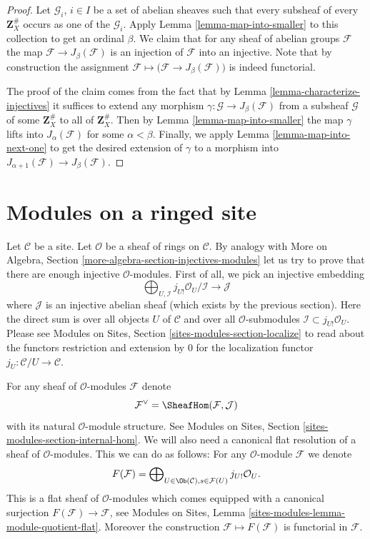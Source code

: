 \begin{proof}
Let $\mathcal{G}_i$, $i \in I$ be a set of abelian
sheaves such that every subsheaf of every $\mathbf{Z}_X^\#$
occurs as one of the $\mathcal{G}_i$. Apply
Lemma \ref{lemma-map-into-smaller} to this collection to
get an ordinal $\beta$. We claim that for any sheaf of abelian
groups $\mathcal{F}$ the map $\mathcal{F} \to J_\beta(\mathcal{F})$
is an injection of $\mathcal{F}$ into an injective.
Note that by construction the assignment
$\mathcal{F} \mapsto \big(\mathcal{F} \to J_\beta(\mathcal{F})\big)$
is indeed functorial.

\medskip\noindent
The proof of the claim comes from the fact that by
Lemma \ref{lemma-characterize-injectives} it suffices to extend any
morphism $\gamma : \mathcal{G} \to J_\beta(\mathcal{F})$
from a subsheaf $\mathcal{G}$ of some $\mathbf{Z}_X^\#$ to all of
$\mathbf{Z}_X^\#$. Then by Lemma \ref{lemma-map-into-smaller} the
map $\gamma$ lifts into $J_\alpha(\mathcal{F})$ for some
$\alpha < \beta$. Finally, we apply Lemma \ref{lemma-map-into-next-one}
to get the desired extension of $\gamma$ to a morphism
into $J_{\alpha + 1}(\mathcal{F}) \to J_\beta(\mathcal{F})$.
\end{proof}






\section{Modules on a ringed site}
\label{section-sheaves-modules}

\noindent
Let $\mathcal{C}$ be a site.
Let $\mathcal{O}$ be a sheaf of rings on $\mathcal{C}$.
By analogy with
More on Algebra, Section \ref{more-algebra-section-injectives-modules}
let us try to prove that there are enough injective
$\mathcal{O}$-modules. First of all, we pick an injective
embedding
$$
\bigoplus\nolimits_{U, \mathcal{I}}
j_{U!}\mathcal{O}_U/\mathcal{I}
\longrightarrow
\mathcal{J}
$$
where $\mathcal{J}$ is an injective abelian sheaf (which
exists by the previous section). Here the direct sum is
over all objects $U$ of $\mathcal{C}$ and over all
$\mathcal{O}$-submodules $\mathcal{I} \subset j_{U!}\mathcal{O}_U$.
Please see
Modules on Sites, Section \ref{sites-modules-section-localize}
to read about the functors restriction and
extension by $0$ for the localization functor
$j_U : \mathcal{C}/U \to \mathcal{C}$.

\medskip\noindent
For any sheaf of $\mathcal{O}$-modules $\mathcal{F}$ denote
$$
\mathcal{F}^\vee
=
\SheafHom(\mathcal{F}, \mathcal{J})
$$
with its natural $\mathcal{O}$-module structure.
See Modules on Sites, Section \ref{sites-modules-section-internal-hom}.
We will also need
a canonical flat resolution of a sheaf of $\mathcal{O}$-modules.
This we can do as follows: For any $\mathcal{O}$-module
$\mathcal{F}$ we denote
$$
F(\mathcal{F})
=
\bigoplus\nolimits_{U \in \Ob(\mathcal{C}), s \in \mathcal{F}(U)}
j_{U!}\mathcal{O}_U.
$$
This is a flat sheaf of $\mathcal{O}$-modules which comes equipped
with a canonical surjection $F(\mathcal{F}) \to \mathcal{F}$, see
Modules on Sites, Lemma \ref{sites-modules-lemma-module-quotient-flat}.
Moreover the construction $\mathcal{F} \mapsto F(\mathcal{F})$
is functorial in $\mathcal{F}$.

